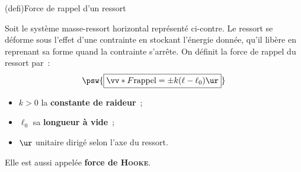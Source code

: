 \documentclass[../../main/main.tex]{subfiles}
\begin{document}
\begin{tcb*}[sidebyside, righthand ratio=.45](defi){Force de rappel d'un ressort}

	Soit le système masse-ressort horizontal représenté ci-contre. Le ressort se
	déforme sous l'effet d'une contrainte en stockant l'énergie donnée, qu'il
	libère en reprenant sa forme quand la contrainte s'arrête. On définit la
	force de rappel du ressort par~:
	\begin{equation*}
		\psw{\boxed{\vv*{F}{\rm rappel} = \pm k(\ell - \ell_0)\ur}}
	\end{equation*}
	\begin{itemize}
		\item $k > 0$ la \textbf{constante de raideur}~;
		\item $\ell_0$ sa \textbf{longueur à vide}~;
		\item $\ur$ unitaire dirigé selon l'axe du ressort.
	\end{itemize}
	\begin{center}
		Elle est aussi appelée \textbf{force de \textsc{Hooke}}.
	\end{center}
	\tcblower
	\begin{center}
\end{center}
\end{tcb*}
\end{document}
